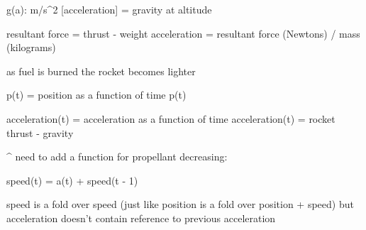 \documentclass[12pt]{article}
\title{}
\author{Thomas Jakway}
\date{}
\begin{document}
\maketitle


g(a): m/s^2 [acceleration] = gravity at altitude

resultant force = thrust - weight
acceleration = resultant force (Newtons) / mass (kilograms)

as fuel is burned the rocket becomes lighter


p(t) = position as a function of time
p(t)

acceleration(t) = acceleration as a function of time
acceleration(t) = rocket thrust - gravity 

^ need to add a function for propellant decreasing:
    

speed(t) = a(t) + speed(t - 1)

speed is a fold over speed (just like position is a fold over position + speed)
but acceleration doesn't contain reference to previous acceleration
\end{document}

